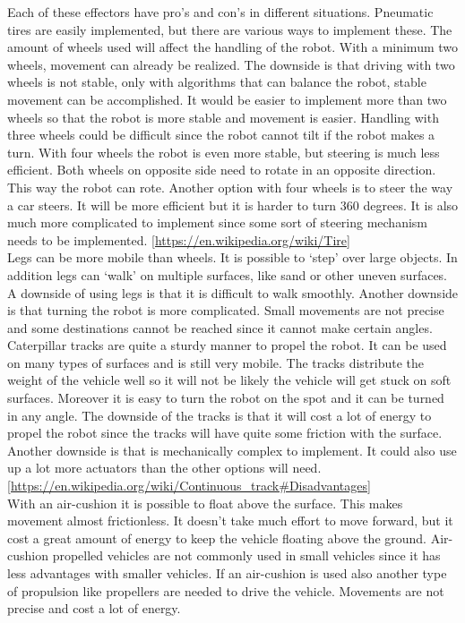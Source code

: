 \documentclass[10pt,a4paper]{article}
\begin{document}
Each of these effectors have pro's and con's in different situations. Pneumatic tires are easily implemented, but there are various ways to implement these. The amount of wheels used will affect the handling of the robot. With a minimum two wheels, movement can already be realized. The downside is that driving with two wheels is not stable, only with algorithms that can balance the robot, stable movement can be accomplished. It would be easier to implement more than two wheels so that the robot is more stable and movement is easier. Handling with three wheels could be difficult since the robot cannot tilt if the robot makes a turn. With four wheels the robot is even more stable, but steering is much less efficient. Both wheels on opposite side need to rotate in an opposite direction. This way the robot can rote. Another option with four wheels is to steer the way a car steers. It will be more efficient but it is harder to turn 360 degrees. It is also much more complicated to implement since some sort of steering mechanism needs to be implemented. \ref {https://en.wikipedia.org/wiki/Tire} \\ 

Legs can be more mobile than wheels. It is possible to ‘step’ over large objects. In addition legs can ‘walk’ on multiple surfaces, like sand or other uneven surfaces. A downside of using legs is that it is difficult to walk smoothly. Another downside is that turning the robot is more complicated. Small movements are not precise and some destinations cannot be reached since it cannot make certain angles.	\\

Caterpillar tracks are quite a sturdy manner to propel the robot. It can be used on many types of surfaces and is still very mobile. The tracks distribute the weight of the vehicle well so it will not be likely the vehicle will get stuck on soft surfaces. Moreover it is easy to turn the robot on the spot and it can be turned in any angle. The downside of the tracks is that it will cost a lot of energy to propel the robot since the tracks will have quite some friction with the surface. Another downside is that is mechanically complex to implement. It could also use up a lot more actuators than the other options will need. \ref{https://en.wikipedia.org/wiki/Continuous_track#Disadvantages} \\

With an air-cushion it is possible to float above the surface. This makes movement almost frictionless. It doesn’t take much effort to move forward, but it cost a great amount of energy to keep the vehicle floating above the ground. Air-cushion propelled vehicles are not commonly used in small vehicles since it has less advantages with smaller vehicles. If an air-cushion is used also another type of propulsion like propellers are needed to drive the vehicle. Movements are not precise and cost a lot of energy. 
\end{document}
